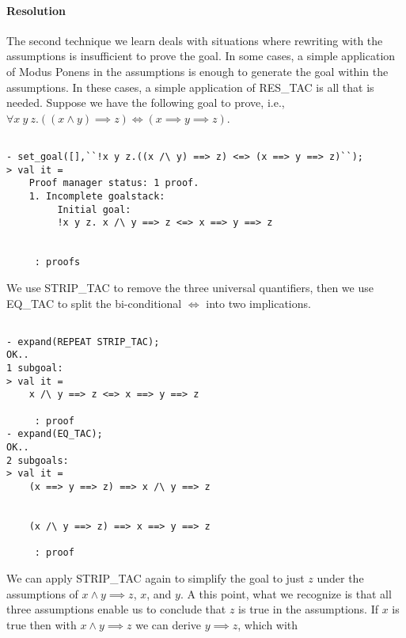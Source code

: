 \paragraph*{Resolution}

The second technique we learn deals with situations where rewriting
with the assumptions is insufficient to prove the goal.  In some
cases, a simple application of Modus Ponens in the assumptions is
enough to generate the goal within the assumptions. In these cases, a
simple application of RES\_TAC is all that is needed.  Suppose we have
the following goal to prove, i.e., $\forall x\:y\:z.((x \wedge y)
\implies z) \Leftrightarrow (x \implies y \implies z)$.
\begin{session}
  \begin{scriptsize}
\begin{verbatim}

- set_goal([],``!x y z.((x /\ y) ==> z) <=> (x ==> y ==> z)``);
> val it =
    Proof manager status: 1 proof.
    1. Incomplete goalstack:
         Initial goal:
         !x y z. x /\ y ==> z <=> x ==> y ==> z
         
         
     : proofs
\end{verbatim}
  \end{scriptsize}
\end{session}
We use STRIP\_TAC to remove the three universal quantifiers, then we
use EQ\_TAC to split the bi-conditional $\Leftrightarrow$ into two
implications.
\begin{session}
  \begin{scriptsize}
\begin{verbatim}

- expand(REPEAT STRIP_TAC);
OK..
1 subgoal:
> val it =
    x /\ y ==> z <=> x ==> y ==> z
    
     : proof
- expand(EQ_TAC);
OK..
2 subgoals:
> val it =
    (x ==> y ==> z) ==> x /\ y ==> z
    
    
    (x /\ y ==> z) ==> x ==> y ==> z
    
     : proof
\end{verbatim}
  \end{scriptsize}
\end{session}
We can apply STRIP\_TAC again to simplify the goal to just $z$ under
the assumptions of $x \wedge y \implies z$, $x$, and $y$. A this
point, what we recognize is that all three assumptions enable us to
conclude that $z$ is true in the assumptions.  If $x$ is true then
with $x \wedge y \implies z$ we can derive $y \implies z$, which with
